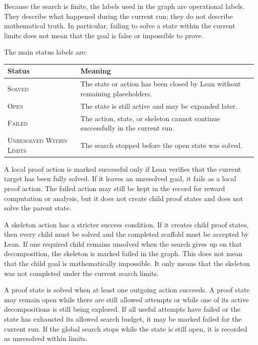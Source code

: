 \documentclass[en]{uet_awesome_thesis/uet-awesome-thesis}
\begin{document}
Because the search is finite, the labels used in the graph are operational labels. They describe what happened during the current run; they do not describe mathematical truth. In particular, failing to solve a state within the current limits does not mean that the goal is false or impossible to prove.

The main status labels are:

\begin{center}
\begin{tabular}{ll}
\hline
\textbf{Status} & \textbf{Meaning} \\
\hline
\textsc{Solved} & The state or action has been closed by Lean without remaining placeholders. \\
\textsc{Open} & The state is still active and may be expanded later. \\
\textsc{Failed} & The action, state, or skeleton cannot continue successfully in the current run. \\
\textsc{Unresolved Within Limits} & The search stopped before the open state was solved. \\
\hline
\end{tabular}
\end{center}

A local proof action is marked successful only if Lean verifies that the current target has been fully solved. If it leaves an unresolved goal, it fails as a local proof action. The failed action may still be kept in the record for reward computation or analysis, but it does not create child proof states and does not solve the parent state.

A skeleton action has a stricter success condition. If it creates child proof states, then every child must be solved and the completed scaffold must be accepted by Lean. If one required child remains unsolved when the search gives up on that decomposition, the skeleton is marked failed in the graph. This does not mean that the child goal is mathematically impossible. It only means that the skeleton was not completed under the current search limits.

A proof state is solved when at least one outgoing action succeeds. A proof state may remain open while there are still allowed attempts or while one of its active decompositions is still being explored. If all useful attempts have failed or the state has exhausted its allowed search budget, it may be marked failed for the current run. If the global search stops while the state is still open, it is recorded as unresolved within limits.
\end{document}
